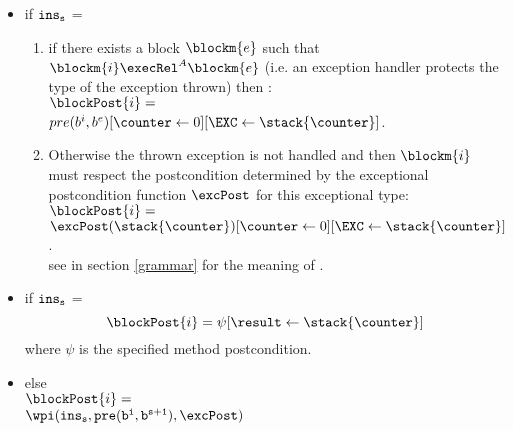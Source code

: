 \begin{defn}
\begin{itemize}
\item  if  $\tt{ins}_s$ =   \\ 
	\begin{enumerate}
\item if there exists a block $\blockm{e}$ such that 
$\blockm{i} \execRel^A \blockm{e}$ (i.e. an exception handler protects the type of the exception thrown)
then :\\
$\blockPost{i }=$\\
$ pre(b^{i}, b^{e})[\counter \leftarrow 0][\EXC \leftarrow \stack{\counter}] $. \\
\item Otherwise the thrown exception is not handled and then $\blockm{i}$ must respect the postcondition determined by
the exceptional postcondition function $\excPost$ for this exceptional type:\\ %
 $\blockPost{i }=$\\ $\excPost(\stack{\counter}) [\counter \leftarrow 0][\EXC \leftarrow \stack{\counter}] $. \\
see in section \ref{grammar} for the meaning of \EXC.
    \end{enumerate}
\item  if  $\tt{ins}_s$ =  \\
$$
   \blockPost{i } = \psi[\result \leftarrow \stack{\counter} ]    
$$
where $\psi $ is the specified method postcondition.
\item  else  \\[3 mm]
 $ \blockPost{i} =$  \\ $\wpi(  \tt{ins}_s , pre(b^{i}, b^{s+1}) , \excPost)  $
 \end{itemize}

\end{defn}

